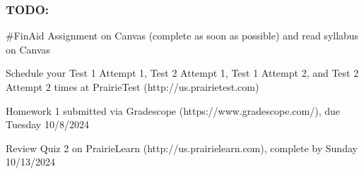 \begin{itemize}


\end{itemize}

\vspace{-50pt}

\subsubsection*{TODO:}
\begin{list}{\itemsep-10pt}
   \item \#FinAid Assignment on Canvas (complete as soon as possible) and read syllabus on Canvas
   \item Schedule your Test 1 Attempt 1, Test 2 Attempt 1, Test 1 Attempt 2, and Test 2 Attempt 2 times 
   at PrairieTest (http://us.prairietest.com)
   \item Homework 1 submitted via Gradescope (https://www.gradescope.com/), due Tuesday 10/8/2024
   \item Review Quiz 2 on PrairieLearn (http://us.prairielearn.com), complete by Sunday 10/13/2024
\end{list}


